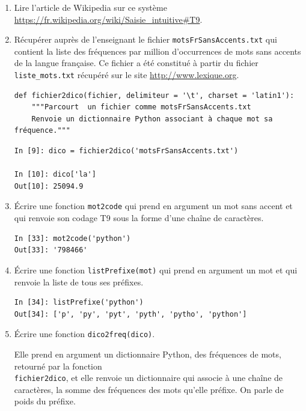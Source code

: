 \documentclass[a4paper, french, 12pt]{article}  %
\newcounter{act}
\newcounter{def}
\begin{document}
\begin{enumerate}



	\item Lire l'article de Wikipedia sur ce système \url{https://fr.wikipedia.org/wiki/Saisie_intuitive#T9}.
	
	\item Récupérer auprès de l'enseignant le fichier \texttt{motsFrSansAccents.txt} qui contient la liste des fréquences par million d'occurrences de  mots sans accents de la langue française. Ce fichier a été constitué à partir du fichier \verb+liste_mots.txt+ récupéré sur le site \url{http://www.lexique.org}.
	

\begin{lstlisting}
def fichier2dico(fichier, delimiteur = '\t', charset = 'latin1'):  
	"""Parcourt  un fichier comme motsFrSansAccents.txt 
	Renvoie un dictionnaire Python associant à chaque mot sa fréquence."""  
\end{lstlisting}
 
	
\begin{lstlisting}
In [9]: dico = fichier2dico('motsFrSansAccents.txt')

In [10]: dico['la']
Out[10]: 25094.9
\end{lstlisting}

  \item Écrire une fonction \texttt{mot2code} qui prend en argument un mot sans accent et qui renvoie son codage T9 sous la forme d'une chaîne de caractères.
  
\begin{lstlisting}
In [33]: mot2code('python')
Out[33]: '798466'
\end{lstlisting}
  
 \item Écrire une fonction \texttt{listPrefixe(mot)} qui prend en argument un mot et qui renvoie la liste de tous ses préfixes.
 
\begin{lstlisting}
In [34]: listPrefixe('python')
Out[34]: ['p', 'py', 'pyt', 'pyth', 'pytho', 'python']
\end{lstlisting}
 
 \item Écrire une fonction \texttt{dico2freq(dico)}. 
 
 Elle prend en argument un dictionnaire Python, des fréquences de mots, retourné par la fonction \\
 \texttt{fichier2dico}, et elle renvoie un dictionnaire qui associe à une chaîne de caractères, la somme des fréquences des mots qu'elle préfixe. On parle de poids du préfixe.
 

\end{enumerate}
\end{document}
